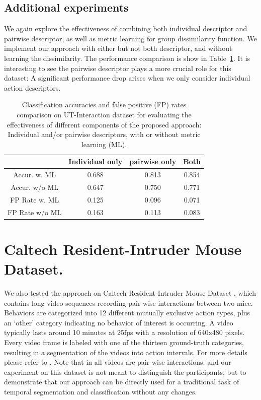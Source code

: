 \documentclass[10pt,twocolumn,letterpaper]{article}
\begin{document}
\subsection{Additional experiments}
We again explore the effectiveness of combining both individual descriptor and pairwise descriptor, as well as metric learning for group dissimilarity function. We implement our approach with either but not both descriptor, and without learning the dissimilarity. The performance comparison is show in Table~\ref{UTaccuFPdegrade}. It is interesting to see the pairwise descriptor plays a more crucial role for this dataset: A significant performance drop arises when we only consider individual action descriptors. 

\begin{table}[h]
\centering \caption{Classification accuracies and false positive (FP) rates comparison on UT-Interaction dataset for evaluating the effectiveness of different components of the proposed approach: Individual and/or pairwise descriptors, with or without metric learning (ML).}
\footnotesize{
\begin{tabular}{|c|c|c|c|}
\hline   & Individual only & pairwise only & Both \\
\hline Accur. w. ML & 0.688 & 0.813 & 0.854  \\
\hline Accur. w/o ML & 0.647 & 0.750 & 0.771    \\
\hline FP Rate w. ML &  0.125 & 0.096 & 0.071  \\
\hline FP Rate w/o ML & 0.163 & 0.113 & 0.083\\
\hline 
\end{tabular}
}
\label{UTaccuFPdegrade}
\end{table}


\section{Caltech Resident-Intruder Mouse Dataset.} 

We also tested the approach on Caltech Resident-Intruder Mouse Dataset \cite{CRIM13}, which contains long video sequences recording pair-wise interactions between two mice. Behaviors are categorized into 12 different mutually exclusive action types, plus an `other' category indicating no behavior of interest is occurring. A video typically lasts around 10 minutes at 25fps with a resolution of 640x480 pixels. Every video frame is labeled with one of the thirteen ground-truth categories, resulting in a segmentation of the videos
into action intervals. For more details please refer to \cite{CRIM13}. Note that in all videos are pair-wise interactions, and our experiment on this dataset is not meant to distinguish the participants, but to demonstrate that our approach can be directly used for a traditional task of temporal segmentation and classification without any changes.
\end{document}
